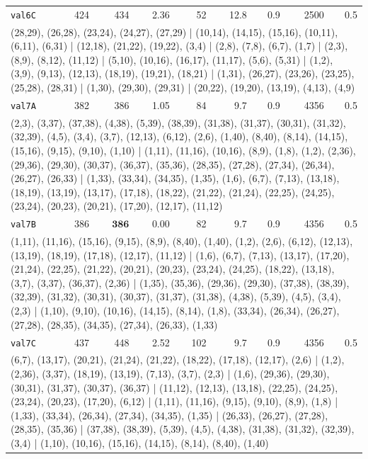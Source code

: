 \begin{landscape}
\begin{longtable}{lrrrrrrrr}
\texttt{val6C} & 424 & 434 & 2.36 & 52 & 12.8 & 0.9 & 2500 & 0.5 \\
\multicolumn{9}{p{0.96\linewidth}}{\tiny\raggedright\arraybackslash (28,29), (26,28), (23,24), (24,27), (27,29) | (10,14), (14,15), (15,16), (10,11), (6,11), (6,31) | (12,18), (21,22), (19,22), (3,4) | (2,8), (7,8), (6,7), (1,7) | (2,3), (8,9), (8,12), (11,12) | (5,10), (10,16), (16,17), (11,17), (5,6), (5,31) | (1,2), (3,9), (9,13), (12,13), (18,19), (19,21), (18,21) | (1,31), (26,27), (23,26), (23,25), (25,28), (28,31) | (1,30), (29,30), (29,31) | (20,22), (19,20), (13,19), (4,13), (4,9)} \\[2pt]
\texttt{val7A} & 382 & 386 & 1.05 & 84 & 9.7 & 0.9 & 4356 & 0.5 \\
\multicolumn{9}{p{0.96\linewidth}}{\tiny\raggedright\arraybackslash (2,3), (3,37), (37,38), (4,38), (5,39), (38,39), (31,38), (31,37), (30,31), (31,32), (32,39), (4,5), (3,4), (3,7), (12,13), (6,12), (2,6), (1,40), (8,40), (8,14), (14,15), (15,16), (9,15), (9,10), (1,10) | (1,11), (11,16), (10,16), (8,9), (1,8), (1,2), (2,36), (29,36), (29,30), (30,37), (36,37), (35,36), (28,35), (27,28), (27,34), (26,34), (26,27), (26,33) | (1,33), (33,34), (34,35), (1,35), (1,6), (6,7), (7,13), (13,18), (18,19), (13,19), (13,17), (17,18), (18,22), (21,22), (21,24), (22,25), (24,25), (23,24), (20,23), (20,21), (17,20), (12,17), (11,12)} \\[2pt]
\texttt{val7B} & 386 & $\mathbf{386}$ & 0.00 & 82 & 9.7 & 0.9 & 4356 & 0.5 \\
\multicolumn{9}{p{0.96\linewidth}}{\tiny\raggedright\arraybackslash (1,11), (11,16), (15,16), (9,15), (8,9), (8,40), (1,40), (1,2), (2,6), (6,12), (12,13), (13,19), (18,19), (17,18), (12,17), (11,12) | (1,6), (6,7), (7,13), (13,17), (17,20), (21,24), (22,25), (21,22), (20,21), (20,23), (23,24), (24,25), (18,22), (13,18), (3,7), (3,37), (36,37), (2,36) | (1,35), (35,36), (29,36), (29,30), (37,38), (38,39), (32,39), (31,32), (30,31), (30,37), (31,37), (31,38), (4,38), (5,39), (4,5), (3,4), (2,3) | (1,10), (9,10), (10,16), (14,15), (8,14), (1,8), (33,34), (26,34), (26,27), (27,28), (28,35), (34,35), (27,34), (26,33), (1,33)} \\[2pt]
\texttt{val7C} & 437 & 448 & 2.52 & 102 & 9.7 & 0.9 & 4356 & 0.5 \\
\multicolumn{9}{p{0.96\linewidth}}{\tiny\raggedright\arraybackslash (6,7), (13,17), (20,21), (21,24), (21,22), (18,22), (17,18), (12,17), (2,6) | (1,2), (2,36), (3,37), (18,19), (13,19), (7,13), (3,7), (2,3) | (1,6), (29,36), (29,30), (30,31), (31,37), (30,37), (36,37) | (11,12), (12,13), (13,18), (22,25), (24,25), (23,24), (20,23), (17,20), (6,12) | (1,11), (11,16), (9,15), (9,10), (8,9), (1,8) | (1,33), (33,34), (26,34), (27,34), (34,35), (1,35) | (26,33), (26,27), (27,28), (28,35), (35,36) | (37,38), (38,39), (5,39), (4,5), (4,38), (31,38), (31,32), (32,39), (3,4) | (1,10), (10,16), (15,16), (14,15), (8,14), (8,40), (1,40)} \\[2pt]

\end{longtable}
\end{landscape}
